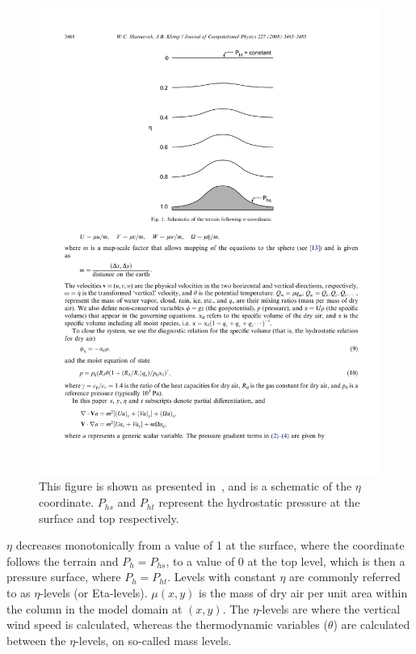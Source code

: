 \begin{figure}[ht]
\centering
\includegraphics[scale=0.9]{model_methods/sigma.pdf}
\caption{This figure is shown as presented in~\citet{Skamarock2008}, and is a schematic of the $\eta$ coordinate. $P_{hs}$ and $P_{ht}$ represent the hydrostatic pressure at the surface and top respectively.}
\label{fig:sigma}
\end{figure}

$\eta$ decreases monotonically from a value of 1 at the surface, where the coordinate follows the terrain and $P_h = P_{hs}$, to a value of 0 at the top level, which is then a pressure surface, where $P_h = P_{ht}$. Levels with constant $\eta$ are commonly referred to as $\eta$-levels (or Eta-levels). $\mu(x,y)$ is the mass of dry air per unit area within the column in the model domain at $(x,y)$. The $\eta$-levels are where the vertical wind speed is calculated, whereas the thermodynamic variables ($\theta$) are calculated between the $\eta$-levels, on so-called mass levels.

